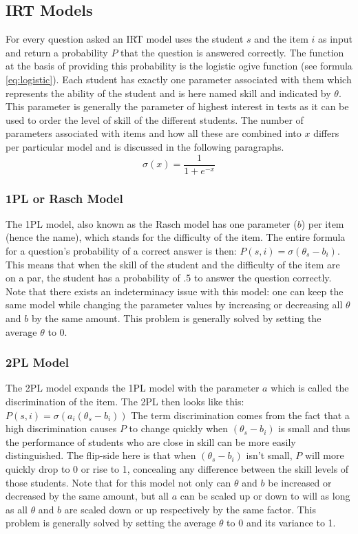 \documentclass{scrartcl}
\begin{document}
\subsection{IRT Models}
For every question asked an IRT model uses the student $s$ and the item $i$ as input and return a probability $P$ that the question is answered correctly. The function at the basis of providing this probability is the logistic ogive function (see formula \ref{eq:logistic}). Each student has exactly one parameter associated with them which represents the ability of the student and is here named skill and indicated by $\theta$. This parameter is generally the parameter of highest interest in tests as it can be used to order the level of skill of the different students. The number of parameters associated with items and how all these are combined into $x$ differs per particular model and is discussed in the following paragraphs.
\begin{equation}
\label{eq:logistic}
\sigma(x) = \frac{1}{1+e^{-x}}
\end{equation}

\subsubsection{1PL or Rasch Model}
The 1PL model, also known as the Rasch model has one parameter ($b$) per item (hence the name), which stands for the difficulty of the item. The entire formula for a question's probability of a correct answer is then: $P(s,i) = \sigma(\theta_{s} - b_{i})$. This means that when the skill of the student and the difficulty of the item are on a par, the student has a probability of .5 to answer the question correctly. Note that there exists an indeterminacy issue with this model: one can keep the same model while changing the parameter values by increasing or decreasing all $\theta$ and $b$ by the same amount. This problem is generally solved by setting the average $\theta$ to 0.

\subsubsection{2PL Model}
The 2PL model expands the 1PL model with the parameter $a$ which is called the discrimination of the item. The 2PL then looks like this: $P(s,i) = \sigma(a_{i} (\theta_{s} - b_{i}))$ The term discrimination comes from the fact that a high discrimination causes $P$ to change quickly when $(\theta_{s} - b_{i})$ is small and thus the performance of students who are close in skill can be more easily distinguished. The flip-side here is that when $(\theta_{s} - b_{i})$ isn't small, $P$ will more quickly drop to 0 or rise to 1, concealing any difference between the skill levels of those students. Note that for this model not only can $\theta$ and $b$ be increased or decreased by the same amount, but all $a$ can be scaled up or down to will as long as all $\theta$ and $b$ are scaled down or up respectively by the same factor. This problem is generally solved by setting the average $\theta$ to 0 and its variance to 1. 
\end{document}
